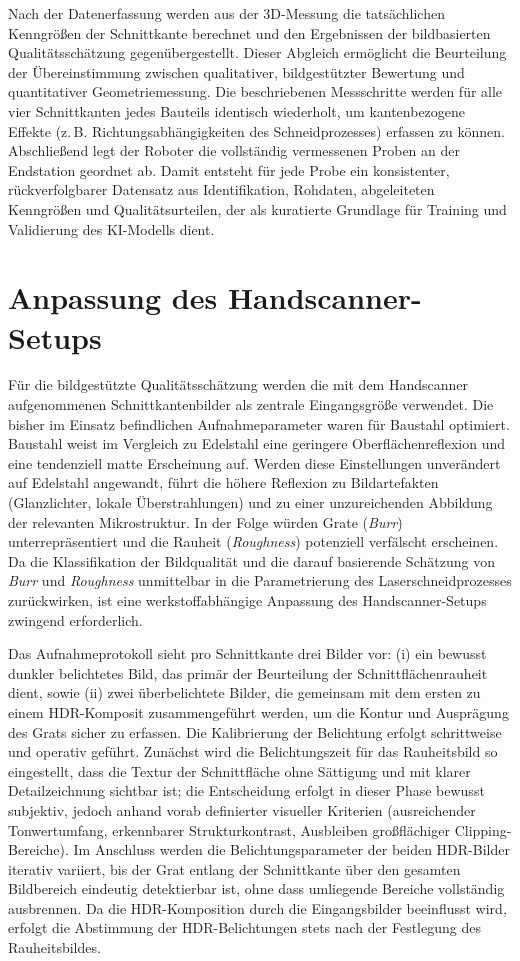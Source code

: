 Nach der Datenerfassung werden aus der 3D-Messung die tatsächlichen Kenngrößen der Schnittkante berechnet und den Ergebnissen der bildbasierten Qualitätsschätzung gegenübergestellt. Dieser Abgleich ermöglicht die Beurteilung der Übereinstimmung zwischen qualitativer, bildgestützter Bewertung und quantitativer Geometriemessung. Die beschriebenen Messschritte werden für alle vier Schnittkanten jedes Bauteils identisch wiederholt, um kantenbezogene Effekte (z.\,B. Richtungsabhängigkeiten des Schneidprozesses) erfassen zu können. Abschließend legt der Roboter die vollständig vermessenen Proben an der Endstation geordnet ab. Damit entsteht für jede Probe ein konsistenter, rückverfolgbarer Datensatz aus Identifikation, Rohdaten, abgeleiteten Kenngrößen und Qualitätsurteilen, der als kuratierte Grundlage für Training und Validierung des KI-Modells dient.

\section{Anpassung des Handscanner-Setups}

Für die bildgestützte Qualitätsschätzung werden die mit dem Handscanner aufgenommenen Schnittkantenbilder als zentrale Eingangsgröße verwendet. Die bisher im Einsatz befindlichen Aufnahmeparameter waren für Baustahl optimiert. Baustahl weist im Vergleich zu Edelstahl eine geringere Oberflächenreflexion und eine tendenziell matte Erscheinung auf. Werden diese Einstellungen unverändert auf Edelstahl angewandt, führt die höhere Reflexion zu Bildartefakten (Glanzlichter, lokale Überstrahlungen) und zu einer unzureichenden Abbildung der relevanten Mikrostruktur. In der Folge würden Grate (\emph{Burr}) unterrepräsentiert und die Rauheit (\emph{Roughness}) potenziell verfälscht erscheinen. Da die Klassifikation der Bildqualität und die darauf basierende Schätzung von \emph{Burr} und \emph{Roughness} unmittelbar in die Parametrierung des Laserschneidprozesses zurückwirken, ist eine werkstoffabhängige Anpassung des Handscanner-Setups zwingend erforderlich.

Das Aufnahmeprotokoll sieht pro Schnittkante drei Bilder vor: (i) ein bewusst dunkler belichtetes Bild, das primär der Beurteilung der Schnittflächenrauheit dient, sowie (ii) zwei überbelichtete Bilder, die gemeinsam mit dem ersten zu einem HDR-Komposit zusammengeführt werden, um die Kontur und Ausprägung des Grats sicher zu erfassen. Die Kalibrierung der Belichtung erfolgt schrittweise und operativ geführt. Zunächst wird die Belichtungszeit für das Rauheitsbild so eingestellt, dass die Textur der Schnittfläche ohne Sättigung und mit klarer Detailzeichnung sichtbar ist; die Entscheidung erfolgt in dieser Phase bewusst subjektiv, jedoch anhand vorab definierter visueller Kriterien (ausreichender Tonwertumfang, erkennbarer Strukturkontrast, Ausbleiben großflächiger Clipping-Bereiche). Im Anschluss werden die Belichtungsparameter der beiden HDR-Bilder iterativ variiert, bis der Grat entlang der Schnittkante über den gesamten Bildbereich eindeutig detektierbar ist, ohne dass umliegende Bereiche vollständig ausbrennen. Da die HDR-Komposition durch die Eingangsbilder beeinflusst wird, erfolgt die Abstimmung der HDR-Belichtungen stets nach der Festlegung des Rauheitsbildes.

